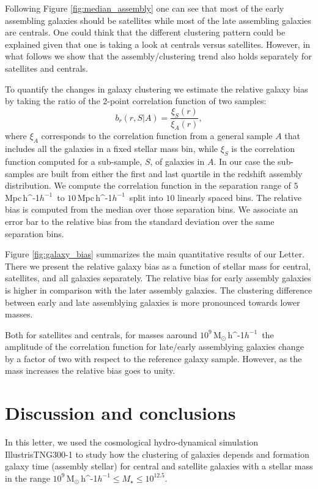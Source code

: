 \documentclass[fleqn,usenatbib]{mnras}
\newcommand{\Msunh}{\,{\rm M}$_{\odot}$\,\ifmmode h^{-1}\else $h^{-1}$\fi}
\newcommand{\Mpch}{\,{\rm Mpc}\,\ifmmode h^{-1}\else $h^{-1}$\fi}
\begin{document}
Following Figure \ref{fig:median_assembly} one can see that most of the early
assembling galaxies should be satellites while most of the late
assembling galaxies are centrals. 
One could think that the different clustering pattern could be
explained given that one is taking a look at centrals versus
satellites. 
However, in what follows we show that the assembly/clustering trend also
holds separately for satellites and centrals.  


To quantify the changes in galaxy clustering we estimate the relative
galaxy bias by taking the ratio of the 2-point correlation function of two
samples: 
%
\begin{equation}
b_r(r, S|A)= \frac{\xi_S(r)}{\xi_A(r)}, 
\label{eq:relative}
\end{equation}
%
where $\xi_A$ corresponds to the correlation function from a general
sample $A$ that includes all the galaxies in a fixed stellar mass bin,
while $\xi_S$ is the correlation function computed for a sub-sample,
$S$, of galaxies in $A$. 
In our case the sub-samples are built from either the first and last
quartile in the redshift assembly distribution. 
We compute the correlation function in the separation range of
$5$\Mpch\ to $10$\Mpch\ split into $10$ linearly spaced bins. 
The relative bias is computed from the median over those separation bins.
We associate an error bar to the relative bias from the standard
deviation over the same separation bins.


Figure \ref{fig:galaxy_bias} summarizes the main quantitative results
of our Letter.
There we present the relative galaxy bias as a
function of stellar mass for central, satellites, and all galaxies
separately. 
The relative bias for early assembly galaxies is higher in comparison
with the later assembly galaxies.
The clustering difference between early and late assemblying galaxies
is more pronounced towards lower masses.

Both for satellites and centrals, for masses aaround
$10^{9}$\Msunh\ the amplitude of the correlation function for
late/early assemblying galaxies change by a factor of two with respect
to the reference galaxy sample. 
However, as the mass increases the relative bias goes to unity.



\section{Discussion and conclusions}
\label{sec:conclu}
In this letter, we used the cosmological hydro-dynamical simulation
IllustrisTNG300-1 to study how the clustering of galaxies depends and
formation galaxy time (assembly stellar) for central and satellite
galaxies with a stellar mass in the range $10^{9}$\Msunh $\leq
M_{\star} \leq 10^{12.5}$. 
\end{document}
